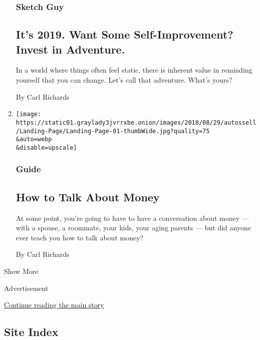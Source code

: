 \begin{enumerate}
{  \subsubsection{Sketch Guy}\label{sketch-guy-8}}

  \hypertarget{its-2019-want-some-self-improvement-invest-in-adventure}{%
  \subsection{It's 2019. Want Some Self-Improvement? Invest in
  Adventure.}\label{its-2019-want-some-self-improvement-invest-in-adventure}}

  In a world where things often feel static, there is inherent value in
  reminding yourself that you can change. Let's call that adventure.
  What's yours?

  By Carl Richards
\item
  \href{/interactive/2018/business/how-to-talk-about-money.html}{}

  \texttt{[image: https://static01.graylady3jvrrxbe.onion/images/2018/08/29/autossell/Landing-Page/Landing-Page-01-thumbWide.jpg?quality=75\\\&auto=webp\\\&disable=upscale]}

  \hypertarget{guide}{%
  \subsubsection{Guide}\label{guide}}

  \hypertarget{how-to-talk-about-money}{%
  \subsection{How to Talk About Money}\label{how-to-talk-about-money}}

  At some point, you're going to have to have a conversation about money
  --- with a spouse, a roommate, your kids, your aging parents --- but
  did anyone ever teach you how to talk about money?

  By Carl Richards
\end{enumerate}

Show More

Advertisement

\protect\hyperlink{after-mid2}{Continue reading the main story}

\hypertarget{site-index}{%
\subsection{Site Index}\label{site-index}}


